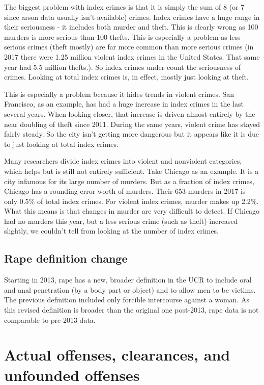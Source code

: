\documentclass[
  12pt,
  openany]{book}
\begin{document}
The biggest problem with index crimes is that it is simply the sum of 8 (or 7 since arson data usually isn't available) crimes. Index crimes have a huge range in their seriousness - it includes both murder and theft. This is clearly wrong as 100 murders is more serious than 100 thefts. This is especially a problem as less serious crimes (theft mostly) are far more common than more serious crimes (in 2017 there were 1.25 million violent index crimes in the United States. That same year had 5.5 million thefts.). So index crimes under-count the seriousness of crimes. Looking at total index crimes is, in effect, mostly just looking at theft.

This is especially a problem because it hides trends in violent crimes. San Francisco, as an example, has had a huge increase in index crimes in the last several years. When looking closer, that increase is driven almost entirely by the near doubling of theft since 2011. During the same years, violent crime has stayed fairly steady. So the city isn't getting more dangerous but it appears like it is due to just looking at total index crimes.

Many researchers divide index crimes into violent and nonviolent categories, which helps but is still not entirely sufficient. Take Chicago as an example. It is a city infamous for its large number of murders. But as a fraction of index crimes, Chicago has a rounding error worth of murders. Their 653 murders in 2017 is only 0.5\% of total index crimes. For violent index crimes, murder makes up 2.2\%. What this means is that changes in murder are very difficult to detect. If Chicago had no murders this year, but a less serious crime (such as theft) increased slightly, we couldn't tell from looking at the number of index crimes.

\hypertarget{rape-definition-change}{%
\subsection{Rape definition change}\label{rape-definition-change}}

Starting in 2013, rape has a new, broader definition in the UCR to include oral and anal penetration (by a body part or object) and to allow men to be victims. The previous definition included only forcible intercourse against a woman. As this revised definition is broader than the original one post-2013, rape data is not comparable to pre-2013 data.

\hypertarget{actual-offenses-clearances-and-unfounded-offenses}{%
\section{Actual offenses, clearances, and unfounded offenses}\label{actual-offenses-clearances-and-unfounded-offenses}}
\end{document}
